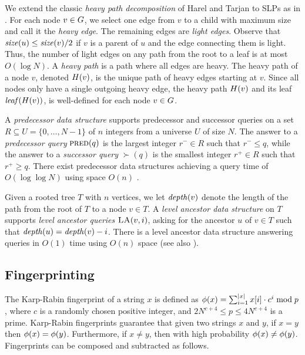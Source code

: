 We extend the classic \emph{heavy path decomposition} of Harel and Tarjan \cite{HT1984} to SLPs as in \cite{bille2011random}. For each node $v \in G$, we select one edge from $v$ to a child with maximum size and call it the \emph{heavy edge}. The remaining edges are \emph{light edges}. Observe that $\mathit{size}(u) \leq \mathit{size}(v)/2$ if $v$ is a parent of $u$ and the edge connecting them is light. Thus, the number of light edges on any path from the root to a leaf is at most $O(\log N)$. 
A \emph{heavy path} is a path where all edges are heavy. The heavy path of a node $v$, denoted $H(v)$, is the unique path of heavy edges starting at $v$. Since all nodes only have a single outgoing heavy edge, the heavy path $H(v)$ and its leaf $\mathit{leaf}(H(v))$, is well-defined for each node $v \in G$.



A \emph{predecessor data structure} supports predecessor and successor queries on a set $R \subseteq U = \{ 0, \ldots, N-1 \}$ of $n$ integers from a universe $U$ of size $N$. The answer to a \emph{predecessor query} $\textsc{pred}(q)$ is the largest integer $r^- \in R$ such that $r^- \leq q$, while the answer to a \emph{successor query} $\succ(q)$ is the smallest integer $r^+ \in R$ such that $r^+ \geq q$. There exist predecessor data structures achieving a query time of $O(\log \log N)$ using space $O(n)$ \cite{van1976design, mehlhorn1990bounded, willard1983log}.

Given a rooted tree $T$ with $n$ vertices, we let $\mathit{depth}(v)$ denote the length of the path from the root of $T$ to a node $v \in T$. A \emph{level ancestor data structure} on $T$ supports \emph{level ancestor queries} $\textsc{LA}(v, i)$, asking for the ancestor $u$ of $v \in T$ such that $\mathit{depth}(u) = \mathit{depth}(v)-i$. There is a level ancestor data structure answering queries in $O(1)$ time using $O(n)$ space \cite{dietz1991finding} (see also \cite{berkman1994finding, alstrup2000improved, bender2004level}).

\subsection{Fingerprinting}
The Karp-Rabin fingerprint \cite{karp1987efficient} of a string $x$ is defined as $\phi(x) = \sum_{i=1}^{|x|} x[i] \cdot c^i \bmod p$, where $c$ is a randomly chosen positive integer, and $2N^{c+4} \leq p \leq 4N^{c+4}$ is a prime. Karp-Rabin fingerprints guarantee that given two strings $x$ and $y$, if $x = y$ then $\phi(x) = \phi(y)$. Furthermore, if $x \neq y$, then with high probability $\phi(x) \neq \phi(y)$. Fingerprints can be composed and subtracted as follows.

